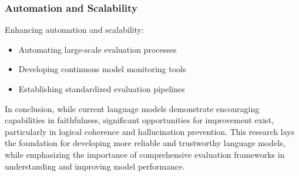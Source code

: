 \subsubsection{Automation and Scalability}
Enhancing automation and scalability:
\begin{itemize}
    \item Automating large-scale evaluation processes
    \item Developing continuous model monitoring tools
    \item Establishing standardized evaluation pipelines
\end{itemize}

In conclusion, while current language models demonstrate encouraging capabilities in faithfulness, significant opportunities for improvement exist, particularly in logical coherence and hallucination prevention. This research lays the foundation for developing more reliable and trustworthy language models, while emphasizing the importance of comprehensive evaluation frameworks in understanding and improving model performance.

